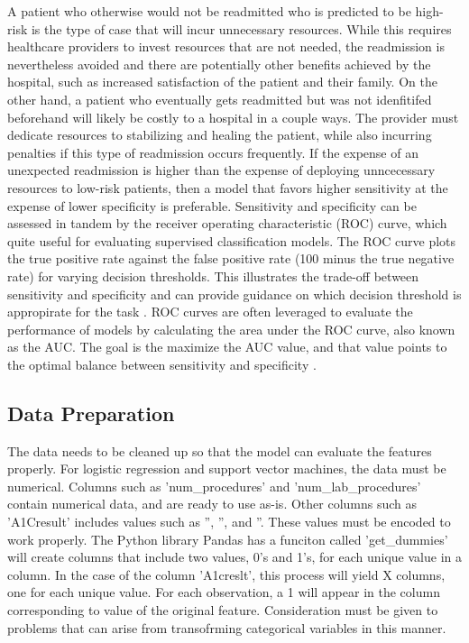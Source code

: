 \documentclass[sigconf]{acmart}
\begin{document}
A patient who otherwise would not be readmitted who is predicted to be high-risk is the type of case that will incur unnecessary resources. While this requires healthcare providers to invest resources that are not needed, the readmission is nevertheless avoided and there are potentially other benefits achieved by the hospital, such as increased satisfaction of the patient and their family. On the other hand, a patient who eventually gets readmitted but was not idenfitifed beforehand will likely be costly to a hospital in a couple ways. The provider must dedicate resources to stabilizing and healing the patient, while also incurring penalties if this type of readmission occurs frequently. If the expense of an unexpected readmission is higher than the expense of deploying unncecessary resources to low-risk patients, then a model that favors higher sensitivity at the expense of lower specificity is preferable.
Sensitivity and specificity can be assessed in tandem by the receiver operating characteristic (ROC) curve, which quite useful for evaluating supervised classification models. The ROC curve plots the true positive rate against the false positive rate (100 minus the true negative rate) for varying decision thresholds. This illustrates the trade-off between sensitivity and specificity and can provide guidance on which decision threshold is appropirate for the task \cite{cite12}. ROC curves are often leveraged to evaluate the performance of models by calculating the area under the ROC curve, also known as the AUC. The goal is the maximize the AUC value, and that value points to the optimal balance between sensitivity and specificity \cite{cite12}.

\subsection{Data Preparation}


The data needs to be cleaned up so that the model can evaluate the features properly. For logistic regression and support vector machines, the data must be numerical. Columns such as 'num\_procedures' and 'num\_lab\_procedures' contain numerical data, and are ready to use as-is. Other columns such as 'A1Cresult' includes values such as '', '', and ''. These values must be encoded to work properly. The Python library Pandas has a funciton called 'get\_dummies' will create columns that include two values, 0's and 1's, for each unique value in a column. In the case of the column 'A1creslt', this process will yield X columns, one for each unique value. For each observation, a 1 will appear in the column corresponding to value of the original feature.
Consideration must be given to problems that can arise from transofrming categorical variables in this manner.  
\end{document}

